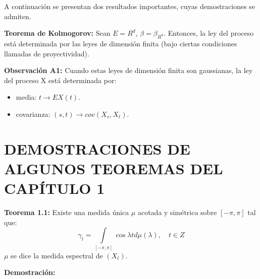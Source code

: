 A continuaci\'{o}n se presentan dos resultados importantes, cuyas demostraciones se admiten.\newline

\textbf{Teorema de Kolmogorov:} Sean $E=R^{d}$, $\beta =\beta_{R^{d}} $. Entonces, la ley del proceso est\'{a} determinada por las leyes de dimensi\'{o}n finita (bajo ciertas condiciones llamadas de proyectividad).\newline

\textbf{Observaci\'{o}n A1:} Cuando estas leyes de dimensi\'{o}n finita son gaussianas, la ley del proceso X est\'{a} determinada por:
\begin{itemize}
      \item media: $t\to EX(t)$.
      \item covarianza: $\left( {s,t} \right)\to cov\left( {X_{s}, X_{t} } \right)$.
\end{itemize}

\section{DEMOSTRACIONES DE ALGUNOS TEOREMAS DEL CAP\'{I}TULO 1}

\textbf{Teorema 1.1:} Existe una medida \'{u}nica $\mu$ acotada y sim\'{e}trica sobre $\left[ {-\pi ,\pi } \right]$ tal que:
\[
\gamma_{t} =\int\limits_{\left[ {-\pi ,\pi } \right]} {\cos \lambda t d\mu \left( \lambda \right)}, \quad t\in Z
\]
$\mu$ se dice la medida espectral de $\left( {X_{t} } \right)$.\newline

\textbf{Demostraci\'{o}n:}\newline

